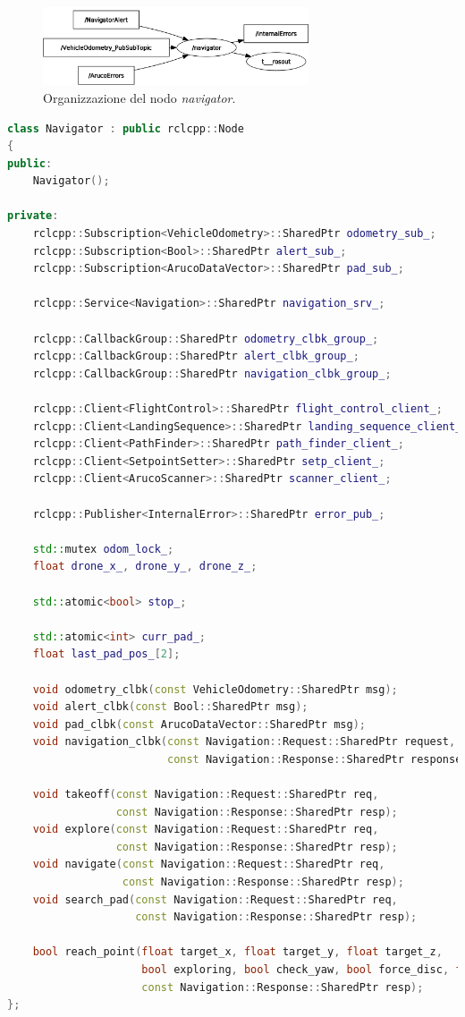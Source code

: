 \begin{figure}
    \centering
    \includegraphics[width=0.7\textwidth]{figs/chapter3/navigator.png}
    \caption{Organizzazione del nodo \emph{navigator}.}
    \label{fig:navnode}
\end{figure}

\begin{lstlisting}[language=C++, caption={Definizione del nodo \emph{navigator}.}, label={lst:navnode}]
class Navigator : public rclcpp::Node
{
public:
    Navigator();

private:
    rclcpp::Subscription<VehicleOdometry>::SharedPtr odometry_sub_;
    rclcpp::Subscription<Bool>::SharedPtr alert_sub_;
    rclcpp::Subscription<ArucoDataVector>::SharedPtr pad_sub_;

    rclcpp::Service<Navigation>::SharedPtr navigation_srv_;

    rclcpp::CallbackGroup::SharedPtr odometry_clbk_group_;
    rclcpp::CallbackGroup::SharedPtr alert_clbk_group_;
    rclcpp::CallbackGroup::SharedPtr navigation_clbk_group_;

    rclcpp::Client<FlightControl>::SharedPtr flight_control_client_;
    rclcpp::Client<LandingSequence>::SharedPtr landing_sequence_client_;
    rclcpp::Client<PathFinder>::SharedPtr path_finder_client_;
    rclcpp::Client<SetpointSetter>::SharedPtr setp_client_;
    rclcpp::Client<ArucoScanner>::SharedPtr scanner_client_;

    rclcpp::Publisher<InternalError>::SharedPtr error_pub_;

    std::mutex odom_lock_;
    float drone_x_, drone_y_, drone_z_;

    std::atomic<bool> stop_;

    std::atomic<int> curr_pad_;
    float last_pad_pos_[2];

    void odometry_clbk(const VehicleOdometry::SharedPtr msg);
    void alert_clbk(const Bool::SharedPtr msg);
    void pad_clbk(const ArucoDataVector::SharedPtr msg);
    void navigation_clbk(const Navigation::Request::SharedPtr request,
                         const Navigation::Response::SharedPtr response);

    void takeoff(const Navigation::Request::SharedPtr req,
                 const Navigation::Response::SharedPtr resp);
    void explore(const Navigation::Request::SharedPtr req,
                 const Navigation::Response::SharedPtr resp);
    void navigate(const Navigation::Request::SharedPtr req,
                  const Navigation::Response::SharedPtr resp);
    void search_pad(const Navigation::Request::SharedPtr req,
                    const Navigation::Response::SharedPtr resp);

    bool reach_point(float target_x, float target_y, float target_z,
                     bool exploring, bool check_yaw, bool force_disc, float step,
                     const Navigation::Response::SharedPtr resp);
};
\end{lstlisting}

